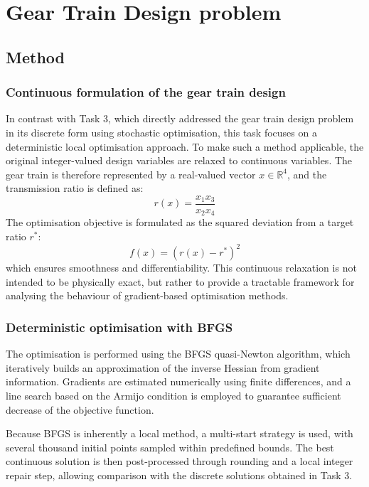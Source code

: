 \section{Gear Train Design problem}

\subsection{Method}

\subsubsection{Continuous formulation of the gear train design}
In contrast with Task 3, which directly addressed the gear train design problem in its discrete form using stochastic optimisation, this task focuses on a deterministic local optimisation approach. To make such a method applicable, the original integer-valued design variables are relaxed to continuous variables. The gear train is therefore represented by a real-valued vector $x \in \mathbb{R}^4$, and the transmission ratio is defined as:
\begin{equation}
r(x) = \frac{x_1 x_3}{x_2 x_4}
\end{equation}
The optimisation objective is formulated as the squared deviation from a target ratio $r^*$:
\begin{equation}
f(x) = (r(x) - r^*)^2
\end{equation}
which ensures smoothness and differentiability. This continuous relaxation is not intended to be physically exact, but rather to provide a tractable framework for analysing the behaviour of gradient-based optimisation methods.

\subsubsection{Deterministic optimisation with BFGS}
The optimisation is performed using the BFGS quasi-Newton algorithm, which iteratively builds an approximation of the inverse Hessian from gradient information. Gradients are estimated numerically using finite differences, and a line search based on the Armijo condition is employed to guarantee sufficient decrease of the objective function.

Because BFGS is inherently a local method, a multi-start strategy is used, with several thousand initial points sampled within predefined bounds. The best continuous solution is then post-processed through rounding and a local integer repair step, allowing comparison with the discrete solutions obtained in Task 3.

